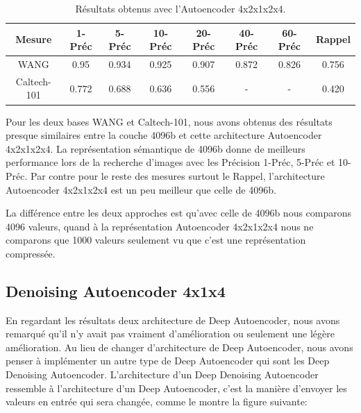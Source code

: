 \begin{table}[H]
\begin{center}
\begin{tabular}{|c|c|c|c|c|c|c|c|}
\hline
	Mesure & 1-Préc & 5-Préc & 10-Préc & 20-Préc & 40-Préc & 60-Préc & Rappel\\
\hline
	WANG & 0.95 & 0.934 & 0.925 & 0.907 & 0.872 & 0.826 & 0.756\\
\hline
	Caltech-101 & 0.772 & 0.688 & 0.636 & 0.556 & - & - & 0.420\\
\hline
\end{tabular}
\end{center}
\caption{Résultats obtenus avec l'Autoencoder 4x2x1x2x4.}
\end{table}

	Pour les deux bases WANG et Caltech-101, nous avons obtenus des résultats presque similaires entre la couche 4096b et cette architecture Autoencoder 4x2x1x2x4. La représentation sémantique de 4096b donne de meilleurs performance lors de la recherche d'images avec les Précision 1-Préc, 5-Préc et 10-Préc. Par contre pour le reste des mesures surtout le Rappel, l'architecture Autoencoder 4x2x1x2x4 est un peu meilleur que celle de 4096b.
	
	La différence entre les deux approches est qu'avec celle de 4096b nous comparons 4096 valeurs, quand à la représentation Autoencoder 4x2x1x2x4 nous ne comparons que 1000 valeurs seulement vu que c'est une représentation compressée.




\subsection{Denoising Autoencoder 4x1x4}
	En regardant les résultats deux architecture de Deep Autoencoder, nous avons remarqué qu'il n'y avait pas vraiment d'amélioration ou seulement une légère amélioration. Au lieu de changer d'architecture de Deep Autoencoder, nous avons penser à implémenter un autre type de Deep Autoencoder qui sont les Deep Denoising Autoencoder. L'architecture d'un Deep Denoising Autoencoder ressemble à l'architecture d'un Deep Autoencoder, c'est la manière d'envoyer les valeurs en entrée qui sera changée, comme le montre la figure suivante:

